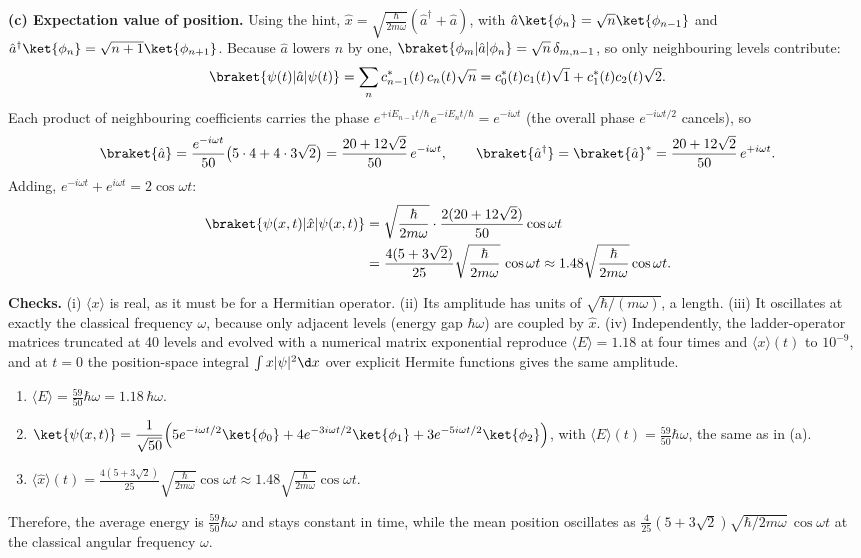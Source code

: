 \begin{solutionbox}
\textbf{(c) Expectation value of position.} Using the hint, $\hat x=\sqrt{\frac{\hbar}{2m\omega}}(\hat a^\dagger+\hat a)$, with $\hat a\ket{\phi_n}=\sqrt n\ket{\phi_{n-1}}$ and $\hat a^\dagger\ket{\phi_n}=\sqrt{n+1}\ket{\phi_{n+1}}$. Because $\hat a$ lowers $n$ by one, $\braket{\phi_m|\hat a|\phi_n}=\sqrt n\,\delta_{m,n-1}$, so only neighbouring levels contribute:
\[
\braket{\psi(t)|\hat a|\psi(t)}=\sum_n c_{n-1}^*(t)\,c_n(t)\sqrt n
=c_0^*(t)c_1(t)\sqrt1+c_1^*(t)c_2(t)\sqrt2 .
\]
Each product of neighbouring coefficients carries the phase $e^{+iE_{n-1}t/\hbar}e^{-iE_nt/\hbar}=e^{-i\omega t}$ (the overall phase $e^{-i\omega t/2}$ cancels), so
\[
\braket{\hat a}=\frac{e^{-i\omega t}}{50}\big(5\cdot4+4\cdot3\sqrt2\big)=\frac{20+12\sqrt2}{50}\,e^{-i\omega t},
\qquad
\braket{\hat a^\dagger}=\braket{\hat a}^*=\frac{20+12\sqrt2}{50}\,e^{+i\omega t}.
\]
Adding, $e^{-i\omega t}+e^{i\omega t}=2\cos\omega t$:
\begin{align*}
\braket{\psi(x,t)|\hat x|\psi(x,t)}&=\sqrt{\frac{\hbar}{2m\omega}}\cdot\frac{2(20+12\sqrt2)}{50}\cos\omega t\\
&=\frac{4(5+3\sqrt2)}{25}\sqrt{\frac{\hbar}{2m\omega}}\,\cos\omega t\approx1.48\sqrt{\frac{\hbar}{2m\omega}}\cos\omega t .
\end{align*}

\textbf{Checks.} (i) $\langle x\rangle$ is real, as it must be for a Hermitian operator. (ii) Its amplitude has units of $\sqrt{\hbar/(m\omega)}$, a length. (iii) It oscillates at exactly the classical frequency $\omega$, because only adjacent levels (energy gap $\hbar\omega$) are coupled by $\hat x$. (iv) Independently, the ladder-operator matrices truncated at 40 levels and evolved with a numerical matrix exponential reproduce $\langle E\rangle=1.18$ at four times and $\langle x\rangle(t)$ to $10^{-9}$, and at $t=0$ the position-space integral $\int x|\psi|^2\d x$ over explicit Hermite functions gives the same amplitude.
\end{solutionbox}

\begin{answerbox}
\begin{enumerate}[label=(\alph*)]
\item $\displaystyle\langle E\rangle=\frac{59}{50}\hbar\omega=1.18\,\hbar\omega$.
\item $\displaystyle\ket{\psi(x,t)}=\frac{1}{\sqrt{50}}\Big(5e^{-i\omega t/2}\ket{\phi_0}+4e^{-3i\omega t/2}\ket{\phi_1}+3e^{-5i\omega t/2}\ket{\phi_2}\Big)$, with $\displaystyle\langle E\rangle(t)=\frac{59}{50}\hbar\omega$, the same as in (a).
\item $\displaystyle\langle\hat x\rangle(t)=\frac{4(5+3\sqrt2)}{25}\sqrt{\frac{\hbar}{2m\omega}}\cos\omega t\approx1.48\sqrt{\frac{\hbar}{2m\omega}}\cos\omega t$.
\end{enumerate}
Therefore, the average energy is $\frac{59}{50}\hbar\omega$ and stays constant in time, while the mean position oscillates as $\tfrac{4}{25}(5+3\sqrt2)\sqrt{\hbar/2m\omega}\,\cos\omega t$ at the classical angular frequency $\omega$.
\end{answerbox}


